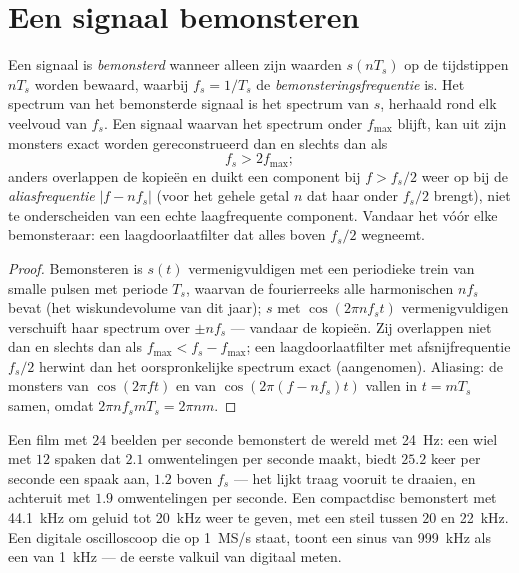 \section{Een signaal bemonsteren}

\begin{theorem}\label{thm:b2:feedback-oscillators:shannon}
Een signaal is \emph{bemonsterd} wanneer alleen zijn waarden $s(nT_s)$ op de
tijdstippen $nT_s$ worden bewaard, waarbij $f_s = 1/T_s$ de
\emph{bemonsteringsfrequentie} is. Het spectrum van het bemonsterde signaal
is het spectrum van $s$, herhaald rond elk veelvoud van $f_s$. Een signaal
waarvan het spectrum onder $f_{\max}$ blijft, kan uit zijn monsters exact
worden gereconstrueerd dan en slechts dan als
\[
f_s > 2f_{\max} ;
\]
anders overlappen de kopieën en duikt een component bij $f > f_s/2$ weer op
bij de \emph{aliasfrequentie} $|f - nf_s|$ (voor het gehele getal $n$ dat
haar onder $f_s/2$ brengt), niet te onderscheiden van een echte
laagfrequente component. Vandaar het \emph{} vóór elke
bemonsteraar: een laagdoorlaatfilter dat alles boven $f_s/2$ wegneemt.
\end{theorem}

\begin{proof}
Bemonsteren is $s(t)$ vermenigvuldigen met een periodieke trein van smalle
pulsen met periode $T_s$, waarvan de fourierreeks alle harmonischen $nf_s$
bevat (het wiskundevolume van dit jaar); $s$ met $\cos(2\pi nf_st)$
vermenigvuldigen verschuift haar spectrum over $\pm nf_s$ --- vandaar de
kopieën. Zij overlappen niet dan en slechts dan als
$f_{\max} < f_s - f_{\max}$; een laagdoorlaatfilter met afsnijfrequentie
$f_s/2$ herwint dan het oorspronkelijke spectrum exact (aangenomen).
Aliasing: de monsters van $\cos(2\pi ft)$ en van $\cos(2\pi(f - nf_s)t)$
vallen in $t = mT_s$ samen, omdat $2\pi nf_smT_s = 2\pi nm$.
\end{proof}

\begin{example}\label{ex:b2:feedback-oscillators:alias}
Een film met $24$ beelden per seconde bemonstert de wereld met \qty{24}{Hz}:
een wiel met $12$ spaken dat $2.1$ omwentelingen per seconde maakt, biedt
$25.2$ keer per seconde een spaak aan, $1.2$ boven $f_s$ --- het lijkt traag
vooruit te draaien, en achteruit met $1.9$ omwentelingen per seconde. Een
compactdisc bemonstert met \qty{44.1}{kHz} om geluid tot \qty{20}{kHz} weer
te geven, met een steil  tussen $20$ en \qty{22}{kHz}. Een
digitale oscilloscoop die op \qty{1}{MS/s} staat, toont een sinus van
\qty{999}{kHz} als een van \qty{1}{kHz} --- de eerste valkuil van digitaal
meten.
\end{example}

